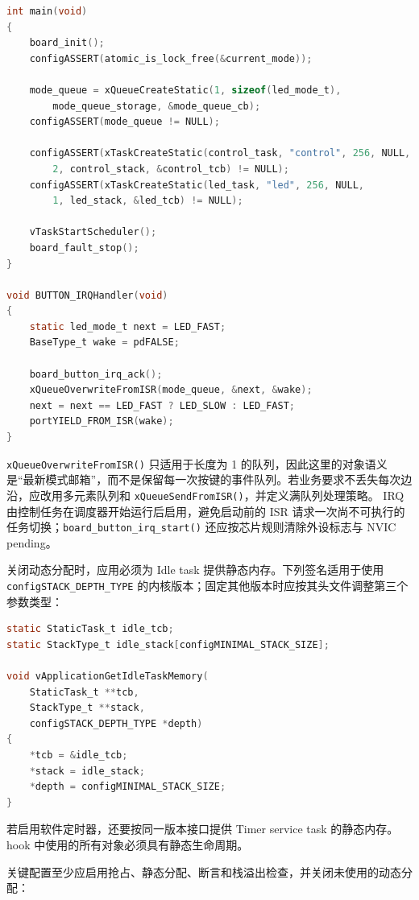 \begin{lstlisting}[language=C,caption={系统初始化与 ISR 事件投递}]
int main(void)
{
    board_init();
    configASSERT(atomic_is_lock_free(&current_mode));

    mode_queue = xQueueCreateStatic(1, sizeof(led_mode_t),
        mode_queue_storage, &mode_queue_cb);
    configASSERT(mode_queue != NULL);

    configASSERT(xTaskCreateStatic(control_task, "control", 256, NULL,
        2, control_stack, &control_tcb) != NULL);
    configASSERT(xTaskCreateStatic(led_task, "led", 256, NULL,
        1, led_stack, &led_tcb) != NULL);

    vTaskStartScheduler();
    board_fault_stop();
}

void BUTTON_IRQHandler(void)
{
    static led_mode_t next = LED_FAST;
    BaseType_t wake = pdFALSE;

    board_button_irq_ack();
    xQueueOverwriteFromISR(mode_queue, &next, &wake);
    next = next == LED_FAST ? LED_SLOW : LED_FAST;
    portYIELD_FROM_ISR(wake);
}
\end{lstlisting}

\texttt{xQueueOverwriteFromISR()} 只适用于长度为 1 的队列，因此这里的对象语义是“最新模式邮箱”，而不是保留每一次按键的事件队列。若业务要求不丢失每次边沿，应改用多元素队列和 \texttt{xQueueSendFromISR()}，并定义满队列处理策略。
IRQ 由控制任务在调度器开始运行后启用，避免启动前的 ISR 请求一次尚不可执行的任务切换；\texttt{board\_button\_irq\_start()} 还应按芯片规则清除外设标志与 NVIC pending。

关闭动态分配时，应用必须为 Idle task 提供静态内存。下列签名适用于使用 \texttt{configSTACK\_DEPTH\_TYPE} 的内核版本；固定其他版本时应按其头文件调整第三个参数类型：

\begin{lstlisting}[language=C,caption={静态 Idle task 内存回调}]
static StaticTask_t idle_tcb;
static StackType_t idle_stack[configMINIMAL_STACK_SIZE];

void vApplicationGetIdleTaskMemory(
    StaticTask_t **tcb,
    StackType_t **stack,
    configSTACK_DEPTH_TYPE *depth)
{
    *tcb = &idle_tcb;
    *stack = idle_stack;
    *depth = configMINIMAL_STACK_SIZE;
}
\end{lstlisting}

若启用软件定时器，还要按同一版本接口提供 Timer service task 的静态内存。hook 中使用的所有对象必须具有静态生命周期。

关键配置至少应启用抢占、静态分配、断言和栈溢出检查，并关闭未使用的动态分配：

